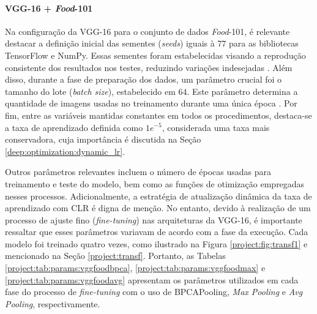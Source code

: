 \paragraph{VGG-16 + \textit{Food}-101}
\label{params:vggfood}
Na configuração da VGG-16 para o conjunto de dados \textit{Food}-101, é relevante destacar a definição inicial das sementes (\textit{seeds}) iguais à $77$ para as bibliotecas TensorFlow e NumPy. Essas sementes foram estabelecidas visando a reprodução consistente dos resultados nos testes, reduzindo variações indesejadas \citep{Alahmari2020ChallengesModels}. Além disso, durante a fase de preparação dos dados, um parâmetro crucial foi o tamanho do lote (\textit{batch size}), estabelecido em $64$. Este parâmetro determina a quantidade de imagens usadas no treinamento durante uma única época \citep{Kandel2020TheDataset}. Por fim, entre as variáveis mantidas constantes em todos os procedimentos, destaca-se a taxa de aprendizado definida como $1e^{-5}$, considerada uma taxa mais conservadora, cuja importância é discutida na Seção \ref{deep:optimization:dynamic_lr}.

Outros parâmetros relevantes incluem o número de épocas usadas para treinamento e teste do modelo, bem como as funções de otimização empregadas nesses processos. Adicionalmente, a estratégia de atualização dinâmica da taxa de aprendizado com CLR \citep{Smith2017CyclicalNetworks} é digna de menção. No entanto, devido à realização de um processo de ajuste fino (\textit{fine-tuning}) nas arquiteturas da VGG-16, é importante ressaltar que esses parâmetros variavam de acordo com a fase da execução. Cada modelo foi treinado quatro vezes, como ilustrado na Figura \ref{project:fig:transf1} e mencionado na Seção \ref{project:transf}. Portanto, as Tabelas \ref{project:tab:params:vggfoodbpca}, \ref{project:tab:params:vggfoodmax} e \ref{project:tab:params:vggfoodavg} apresentam os parâmetros utilizados em cada fase do processo de \textit{fine-tuning} com o uso de BPCAPooling, \textit{Max Pooling} e \textit{Avg Pooling}, respectivamente.


